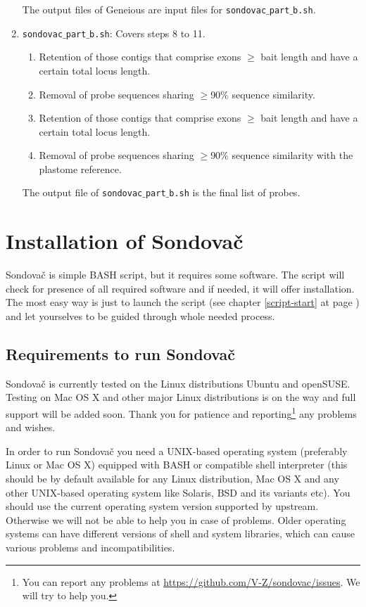 \documentclass[a4paper, 11pt, twoside]{article}
\begin{document}
\begin{enumerate}[label=\textbf{\Alph*.}]
  The output files of Geneious are input files for \texttt{sondovac$\_$part$\_$b.sh}.

  \item \texttt{sondovac$\_$part$\_$b.sh}: Covers steps 8 to 11.
    \begin{enumerate}[label=\textbf{\arabic*.}, resume]
      \item Retention of those contigs that comprise exons $\geq$ bait length and have a certain total locus length.
      \item Removal of probe sequences sharing $\geq$90\% sequence similarity.
      \item Retention of those contigs that comprise exons $\geq$ bait length and have a certain total locus length.
      \item Removal of probe sequences sharing $\geq$90\% sequence similarity with the plastome reference.
    \end{enumerate}

  The output file of \texttt{sondovac$\_$part$\_$b.sh} is the final list of probes.

\end{enumerate}

\section{Installation of Sondovač}
\label{install}

Sondovač is simple BASH script, but it requires some software. The script will check for presence of all required software and if needed, it will offer installation. The most easy way is just to launch the script (see chapter \ref{script-start} at page \pageref{script-start}) and let yourselves to be guided through whole needed process.

\subsection{Requirements to run Sondovač}

Sondovač is currently tested on the Linux distributions Ubuntu and openSUSE. Testing on Mac OS X and other major Linux distributions is on the way and full support will be added soon. Thank you for patience and reporting\footnote{You can report any problems at \href{https://github.com/V-Z/sondovac/issues}{https://github.com/V-Z/sondovac/issues}. We will try to help you.} any problems and wishes.

In order to run Sondovač you need a UNIX-based operating system (preferably Linux or Mac OS X) equipped with BASH or compatible shell interpreter (this should be by default available for any Linux distribution, Mac OS X and any other UNIX-based operating system like Solaris, BSD and its variants etc). You should use the current operating system version supported by upstream. Otherwise we will not be able to help you in case of problems. Older operating systems can have different versions of shell and system libraries, which can cause various problems and incompatibilities.
\end{document}
